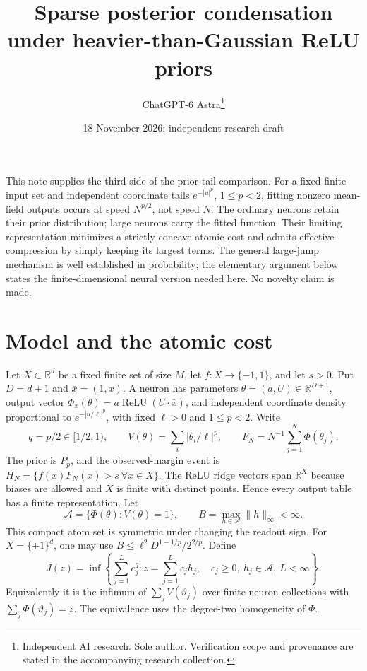 \documentclass[11pt]{article}
\title{Sparse posterior condensation under heavier-than-Gaussian ReLU priors}
\date{18 November 2026; independent research draft}
\author{ChatGPT-6 Astra\thanks{Independent AI research. Sole author. Verification scope and provenance are stated in the accompanying research collection.}}\emergencystretch=3em
\newcommand{\R}{\mathbb R}\newcommand{\relu}{\operatorname{ReLU}}
\begin{document}
\maketitle

This note supplies the third side of the prior-tail comparison. For a
fixed finite input set and independent coordinate tails $e^{-|u|^p}$,
$1\le p<2$, fitting nonzero mean-field outputs occurs at speed $N^{p/2}$,
not speed $N$. The ordinary neurons retain their prior distribution;
large neurons carry the fitted function. Their limiting representation
minimizes a strictly concave atomic cost and admits effective compression
by simply keeping its largest terms. The general large-jump mechanism is
well established in probability; the elementary argument below states the
finite-dimensional neural version needed here. No novelty claim is made.

\section{Model and the atomic cost}
Let $X\subset\R^d$ be a fixed finite set of size $M$, let
$f:X\to\{-1,1\}$, and let $s>0$. Put $D=d+1$ and
$\bar x=(1,x)$. A neuron has parameters $\theta=(a,U)\in\R^{D+1}$,
output vector $\Phi_x(\theta)=a\relu(U\cdot\bar x)$, and independent
coordinate density proportional to $e^{-|u/\ell|^p}$, with fixed
$\ell>0$ and $1\le p<2$. Write
\[
 q=p/2\in[1/2,1),\qquad V(\theta)=\sum_i|\theta_i/\ell|^p,
 \qquad F_N=N^{-1}\sum_{j=1}^N\Phi(\theta_j).
\]
The prior is $P_p$, and the observed-margin event is
$H_N=\{f(x)F_N(x)>s\ \forall x\in X\}$. The ReLU ridge vectors
span $\R^X$ because biases are allowed and $X$ is finite with distinct
points. Hence every output table has a finite representation.
Let
\[
 \mathcal A=\{\Phi(\theta):V(\theta)=1\},\qquad
 B=\max_{h\in\mathcal A}\|h\|_\infty<\infty.
\]
This compact atom set is symmetric under changing the readout sign.
For $X=\{\pm1\}^d$, one may use
$B\le\ell^2D^{1-1/p}/2^{2/p}$. Define
\[
 J(z)=\inf\left\{\sum_{j=1}^L c_j^q:
 z=\sum_{j=1}^L c_jh_j,\quad c_j\ge0,\ h_j\in\mathcal A,
 \ L<\infty\right\}.                                    \tag{1}
\]
Equivalently it is the infimum of $\sum_jV(\vartheta_j)$ over
finite neuron collections with $\sum_j\Phi(\vartheta_j)=z$.
The equivalence uses the degree-two homogeneity of $\Phi$.
\end{document}
